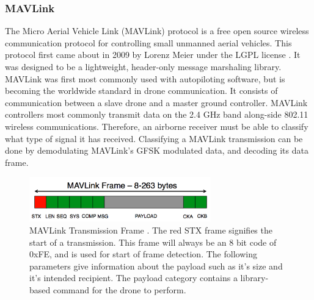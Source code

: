 \subsubsection{MAVLink}
The Micro Aerial Vehicle Link (MAVLink) protocol is a free open source wireless communication protocol for controlling small unmanned aerial vehicles. This protocol first came about in 2009 by Lorenz Meier under the LGPL license \cite{MAVLINK_Website}.  It was designed to be a lightweight, header-only message marshaling library.  MAVLink was first most commonly used with autopiloting software, but is becoming the worldwide standard in drone communication. It consists of communication between a slave drone and a master ground controller.  MAVLink controllers most commonly transmit data on the 2.4 GHz band along-side 802.11 wireless communications. Therefore, an airborne receiver must be able to classify what type of signal it has received. Classifying a MAVLink transmission can be done by demodulating MAVLink's GFSK modulated data, and decoding its data frame.  
\begin{figure}[ht]
\centering
\includegraphics[width=0.70\textwidth]{img/mavlink-packet.png}
\caption{MAVLink Transmission Frame \cite{mavlinkphoto}. The red STX frame signifies the start of a transmission. This frame will always be an 8 bit code of 0xFE, and is used for start of frame detection. The following parameters give information about the payload such as it's size and it's intended recipient.  The payload category contains a library-based command for the drone to perform.}
\label{fig:MAVlink_frame}
\end{figure} \par
